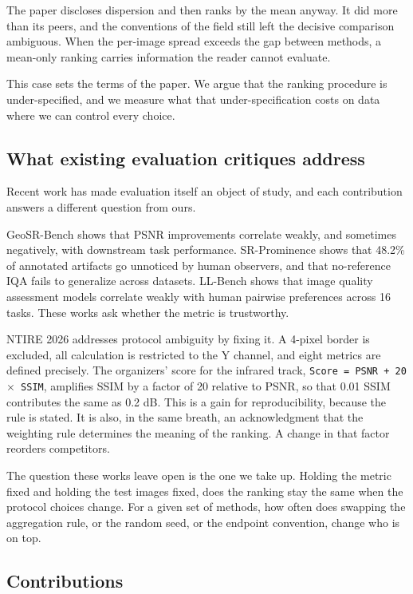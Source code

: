 \documentclass[journal,twoside,10pt]{IEEEtran}
\begin{document}
The paper discloses dispersion and then ranks by the mean anyway. It did more than its peers, and the conventions of the field still left the decisive comparison ambiguous. When the per-image spread exceeds the gap between methods, a mean-only ranking carries information the reader cannot evaluate.

This case sets the terms of the paper. We argue that the ranking procedure is under-specified, and we measure what that under-specification costs on data where we can control every choice.

\subsection{What existing evaluation critiques address}


Recent work has made evaluation itself an object of study, and each contribution answers a different question from ours.

GeoSR-Bench shows that PSNR improvements correlate weakly, and sometimes negatively, with downstream task performance. SR-Prominence shows that 48.2\% of annotated artifacts go unnoticed by human observers, and that no-reference IQA fails to generalize across datasets. LL-Bench shows that image quality assessment models correlate weakly with human pairwise preferences across 16 tasks. These works ask whether the metric is trustworthy.

NTIRE 2026 addresses protocol ambiguity by fixing it. A 4-pixel border is excluded, all calculation is restricted to the Y channel, and eight metrics are defined precisely. The organizers' score for the infrared track, \texttt{Score = PSNR + 20 $\times$ SSIM}, amplifies SSIM by a factor of 20 relative to PSNR, so that 0.01 SSIM contributes the same as 0.2 dB. This is a gain for reproducibility, because the rule is stated. It is also, in the same breath, an acknowledgment that the weighting rule determines the meaning of the ranking. A change in that factor reorders competitors.

The question these works leave open is the one we take up. Holding the metric fixed and holding the test images fixed, does the ranking stay the same when the protocol choices change. For a given set of methods, how often does swapping the aggregation rule, or the random seed, or the endpoint convention, change who is on top.

\subsection{Contributions}
\end{document}
